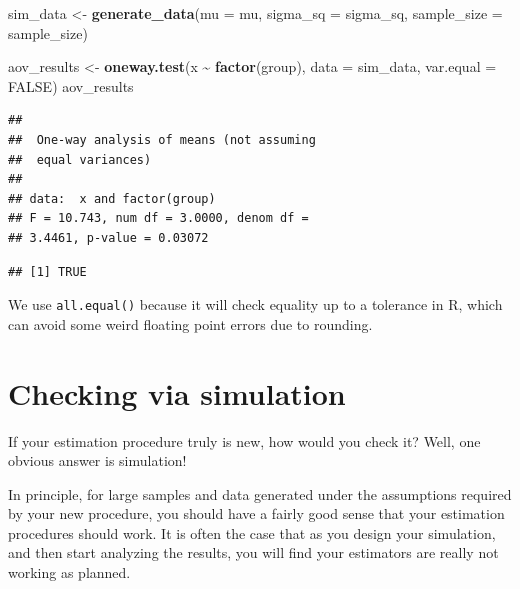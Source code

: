 \documentclass[
]{book}
\newenvironment{Shaded}{\begin{snugshade}}{\end{snugshade}}
\newcommand{\AttributeTok}[1]{\textcolor[rgb]{0.13,0.29,0.53}{#1}}
\newcommand{\ConstantTok}[1]{\textcolor[rgb]{0.56,0.35,0.01}{#1}}
\newcommand{\FunctionTok}[1]{\textcolor[rgb]{0.13,0.29,0.53}{\textbf{#1}}}
\newcommand{\NormalTok}[1]{#1}
\newcommand{\OtherTok}[1]{\textcolor[rgb]{0.56,0.35,0.01}{#1}}
\newcommand{\SpecialCharTok}[1]{\textcolor[rgb]{0.81,0.36,0.00}{\textbf{#1}}}
\begin{document}
\begin{Shaded}
\begin{Highlighting}[]
\NormalTok{sim\_data }\OtherTok{\textless{}{-}} \FunctionTok{generate\_data}\NormalTok{(}\AttributeTok{mu =}\NormalTok{ mu, }\AttributeTok{sigma\_sq =}\NormalTok{ sigma\_sq,}
                          \AttributeTok{sample\_size =}\NormalTok{ sample\_size)}

\NormalTok{aov\_results }\OtherTok{\textless{}{-}} \FunctionTok{oneway.test}\NormalTok{(x }\SpecialCharTok{\textasciitilde{}} \FunctionTok{factor}\NormalTok{(group),}
                           \AttributeTok{data =}\NormalTok{ sim\_data, }
                           \AttributeTok{var.equal =} \ConstantTok{FALSE}\NormalTok{)}
\NormalTok{aov\_results}
\end{Highlighting}
\end{Shaded}

\begin{verbatim}
## 
##  One-way analysis of means (not assuming
##  equal variances)
## 
## data:  x and factor(group)
## F = 10.743, num df = 3.0000, denom df =
## 3.4461, p-value = 0.03072
\end{verbatim}

\begin{Shaded}
\end{Shaded}

\begin{verbatim}
## [1] TRUE
\end{verbatim}

We use \texttt{all.equal()} because it will check equality up to a tolerance in R, which can avoid some weird floating point errors due to rounding.

\section{Checking via simulation}\label{checking-via-simulation}

If your estimation procedure truly is new, how would you check it?
Well, one obvious answer is simulation!

In principle, for large samples and data generated under the assumptions required by your new procedure, you should have a fairly good sense that your estimation procedures should work.
It is often the case that as you design your simulation, and then start analyzing the results, you will find your estimators are really not working as planned.
\end{document}
